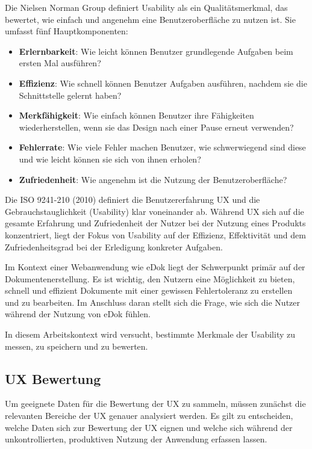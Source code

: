 \documentclass[12pt,oneside]{article}
\begin{document}
Die Nielsen Norman Group definiert \cite{nngroup} Usability als ein Qualitätsmerkmal, das bewertet, wie einfach und angenehm eine Benutzeroberfläche zu nutzen ist. Sie umfasst fünf Hauptkomponenten:
\begin{itemize}
    \item \textbf{Erlernbarkeit}: Wie leicht können Benutzer grundlegende Aufgaben beim ersten Mal ausführen?
    \item \textbf{Effizienz}: Wie schnell können Benutzer Aufgaben ausführen, nachdem sie die Schnittstelle gelernt haben?
    \item \textbf{Merkfähigkeit}: Wie einfach können Benutzer ihre Fähigkeiten wiederherstellen, wenn sie das Design nach einer Pause erneut verwenden?
    \item \textbf{Fehlerrate}: Wie viele Fehler machen Benutzer, wie schwerwiegend sind diese und wie leicht können sie sich von ihnen erholen?
    \item \textbf{Zufriedenheit}: Wie angenehm ist die Nutzung der Benutzeroberfläche?
\end{itemize}
Die ISO 9241-210 (2010) definiert die Benutzererfahrung UX und die Gebrauchstauglichkeit (Usability) klar voneinander ab. Während UX sich auf die gesamte Erfahrung und Zufriedenheit der Nutzer bei der Nutzung eines Produkts konzentriert, liegt der Fokus von Usability auf der Effizienz, Effektivität und dem Zufriedenheitsgrad bei der Erledigung konkreter Aufgaben.

Im Kontext einer Webanwendung wie eDok liegt der Schwerpunkt primär auf der Dokumentenerstellung. Es ist wichtig, den Nutzern eine Möglichkeit zu bieten, schnell und effizient Dokumente mit einer gewissen Fehlertoleranz zu erstellen und zu bearbeiten. Im Anschluss daran stellt sich die Frage, wie sich die Nutzer während der Nutzung von eDok fühlen.

 

In diesem Arbeitskontext wird versucht, bestimmte Merkmale der Usability zu messen, zu speichern und zu bewerten.







\subsection{ UX Bewertung}
 
Um geeignete Daten für die Bewertung der UX zu sammeln, müssen zunächst die relevanten Bereiche der UX genauer analysiert werden. Es gilt zu entscheiden, welche Daten sich zur Bewertung der UX eignen und welche sich während der unkontrollierten, produktiven Nutzung der Anwendung erfassen lassen.
\end{document}
